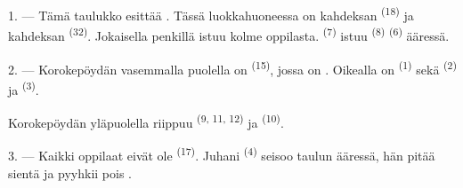 %

\VUsaut{2.0mm}
\VUsaut{3.2mm}
\VUsaut{2.6mm}
\VUsaut{3.4mm}
\VUornamento{9pt}
\VUsaut{5.0mm}
\VUsaut{3.0mm}
\VUfilet{16mm}
\VUsaut{5.6mm}

\VUsaut{1.4mm}
\VUsaut{2.2mm}
\VUfilet{20mm}
\VUsaut{6.4mm}

\VUsaut{3.0mm}

1. --- Tämä taulukko esittää  .
Tässä luokkahuoneessa on kahdeksan  \textsuperscript{(18)} ja
kahdeksan  \textsuperscript{(32)}. Jokaisella penkillä istuu
kolme oppilasta.  \textsuperscript{(7)} istuu
 \textsuperscript{(8)} 
\textsuperscript{(6)} ääressä.

2. --- Korokepöydän vasemmalla puolella on 
\textsuperscript{(15)}, jossa on . Oikealla on
 \textsuperscript{(1)} sekä 
\textsuperscript{(2)} ja  \textsuperscript{(3)}.

Korokepöydän yläpuolella riippuu 
\textsuperscript{(9, 11, 12)} ja  \textsuperscript{(10)}.

3. --- Kaikki oppilaat eivät ole  \textsuperscript{(17)}.
Juhani \textsuperscript{(4)} seisoo taulun ääressä, hän pitää sientä ja pyyhkii
pois .

